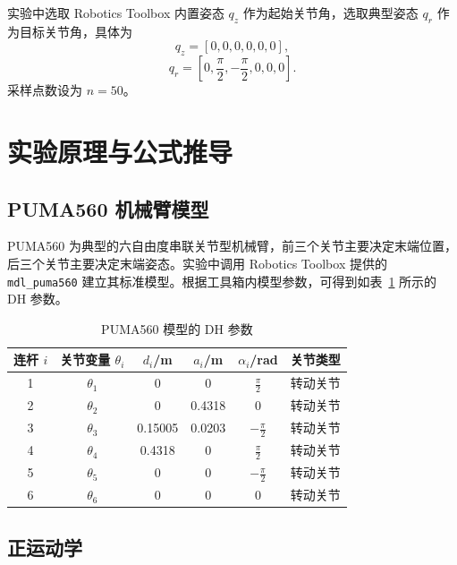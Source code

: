 \documentclass[UTF8,a4paper,12pt]{ctexart}
\begin{document}
实验中选取 Robotics Toolbox 内置姿态 $q_z$ 作为起始关节角，选取典型姿态 $q_r$ 作为目标关节角，具体为
\begin{equation}
q_z=[0,0,0,0,0,0],
\end{equation}
\begin{equation}
q_r=[0,\frac{\pi}{2},-\frac{\pi}{2},0,0,0].
\end{equation}
采样点数设为 $n=50$。

\section{实验原理与公式推导}

\subsection{PUMA560 机械臂模型}

PUMA560 为典型的六自由度串联关节型机械臂，前三个关节主要决定末端位置，后三个关节主要决定末端姿态。实验中调用 Robotics Toolbox 提供的 \texttt{mdl\_puma560} 建立其标准模型。根据工具箱内模型参数，可得到如表~\ref{tab:dh} 所示的 DH 参数。

\begin{table}[H]
  \centering
  \caption{PUMA560 模型的 DH 参数}
  \label{tab:dh}
  \begin{tabular}{cccccc}
    \toprule
    连杆 $i$ & 关节变量 $\theta_i$ & $d_i$/m & $a_i$/m & $\alpha_i$/rad & 关节类型 \\
    \midrule
    1 & $\theta_1$ & 0       & 0      & $\frac{\pi}{2}$  & 转动关节 \\
    2 & $\theta_2$ & 0       & 0.4318 & 0                & 转动关节 \\
    3 & $\theta_3$ & 0.15005 & 0.0203 & $-\frac{\pi}{2}$ & 转动关节 \\
    4 & $\theta_4$ & 0.4318  & 0      & $\frac{\pi}{2}$  & 转动关节 \\
    5 & $\theta_5$ & 0       & 0      & $-\frac{\pi}{2}$ & 转动关节 \\
    6 & $\theta_6$ & 0       & 0      & 0                & 转动关节 \\
    \bottomrule
  \end{tabular}
\end{table}

\subsection{正运动学}
\end{document}
